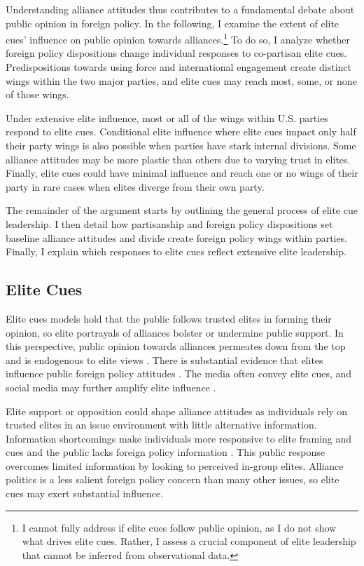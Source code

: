 \documentclass[12pt]{article}
\begin{document}
Understanding alliance attitudes thus contributes to a fundamental debate about public opinion in foreign policy. 
In the following, I examine the extent of elite cues' influence on public opinion towards alliances.\footnote{I cannot fully address if elite cues follow public opinion, as I do not show what drives elite cues. Rather, I assess a crucial component of elite leadership that cannot be inferred from observational data.}
To do so, I analyze whether foreign policy dispositions change individual responses to co-partisan elite cues.
Predispositions towards using force and international engagement create distinct wings within the two major parties, and elite cues may reach most, some, or none of those wings.


Under extensive elite influence, most or all of the wings within U.S. parties respond to elite cues. 
Conditional elite influence where elite cues impact only half their party wings is also possible when parties have stark internal divisions. 
Some alliance attitudes may be more plastic than others due to varying trust in elites. 
Finally, elite cues could have minimal influence and reach one or no wings of their party in rare cases when elites diverge from their own party.


The remainder of the argument starts by outlining the general process of elite cue leadership.
I then detail how partisanship and foreign policy dispositions set baseline alliance attitudes and divide create foreign policy wings within parties.
Finally, I explain which responses to elite cues reflect extensive elite leadership. 


\subsection{Elite Cues} 


Elite cues models hold that the public follows trusted elites in forming their opinion, so elite portrayals of alliances bolster or undermine public support.
In this perspective, public opinion towards alliances permeates down from the top and is endogenous to elite views \citep{Druckman2014}.
There is substantial evidence that elites influence public foreign policy attitudes \citep{BaumPotter2008}. 
The media often convey elite cues, and social media may further amplify elite influence \citep{BaumPotter2019}.   


Elite support or opposition could shape alliance attitudes as individuals rely on trusted elites in an issue environment with little alternative information. 
Information shortcomings make individuals more responsive to elite framing and cues \citep{Druckman2001, Peterson2017} and the public lacks foreign policy information \citep{BaumPotter2008}.
This public response overcomes limited information by looking to perceived in-group elites. 
Alliance politics is a less salient foreign policy concern than many other issues, so elite cues may exert substantial influence.
\end{document}
